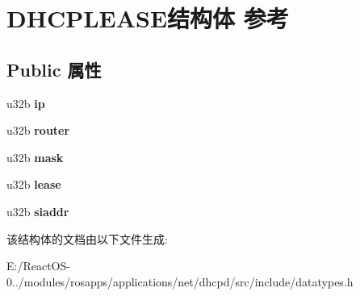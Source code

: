 \hypertarget{struct_d_h_c_p_l_e_a_s_e}{}\section{D\+H\+C\+P\+L\+E\+A\+S\+E结构体 参考}
\label{struct_d_h_c_p_l_e_a_s_e}
\subsection*{Public 属性}
\begin{DoxyCompactItemize}
\item 
\mbox{\label{struct_d_h_c_p_l_e_a_s_e_a981564da4cc8461e2e7951a281157dcc}} 
u32b {\bfseries ip}
\item 
\mbox{\label{struct_d_h_c_p_l_e_a_s_e_a8e9f65120450ab2dad1a9887e0967935}} 
u32b {\bfseries router}
\item 
\mbox{\label{struct_d_h_c_p_l_e_a_s_e_aa6af8c50820752e293c129b5f4903cc6}} 
u32b {\bfseries mask}
\item 
\mbox{\label{struct_d_h_c_p_l_e_a_s_e_a0b003245661a6369db2955fdce2ba475}} 
u32b {\bfseries lease}
\item 
\mbox{\label{struct_d_h_c_p_l_e_a_s_e_a7039574feb44c43ba02204626e102b8d}} 
u32b {\bfseries siaddr}
\end{DoxyCompactItemize}


该结构体的文档由以下文件生成\+:\begin{DoxyCompactItemize}
\item 
E\+:/\+React\+O\+S-\/0../modules/rosapps/applications/net/dhcpd/src/include/datatypes.\+h\end{DoxyCompactItemize}
